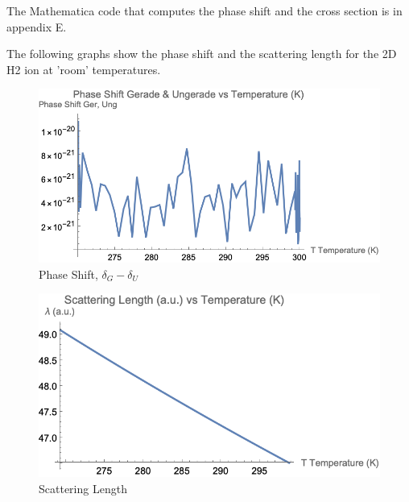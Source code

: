 The Mathematica code that computes the phase shift and the cross section  is in appendix E.

The following graphs show the phase shift and the scattering length for the 2D H2 ion at 'room' temperatures.

\begin{figure}
 \captionsetup{type=figure}
    \includegraphics{PhaseShift-Ger-Ung.png}
  \caption{Phase Shift, $ \delta_G - \delta_U $ }
    \label{phaseShift2D}
\end{figure}


\begin{figure}
 \captionsetup{type=figure}
    \includegraphics{Scatterring-length.png}
  \caption{Scattering Length}
    \label{scatterLen}
\end{figure}
